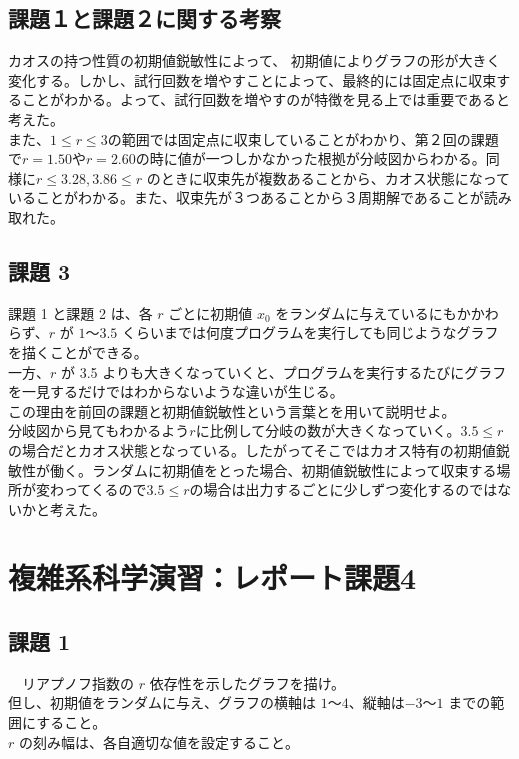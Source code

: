 \documentclass[a4j]{jsarticle}
\begin{document}
\newpage

\subsection{課題１と課題２に関する考察}
カオスの持つ性質の初期値鋭敏性によって、 初期値によりグラフの形が大きく変化する。しかし、試行回数を増やすことによって、最終的には固定点に収束することがわかる。よって、試行回数を増やすのが特徴を見る上では重要であると考えた。\\
また、$1 ≤ r ≤ 3$の範囲では固定点に収束していることがわかり、第２回の課題で$r=1.50$や$r=2.60$の時に値が一つしかなかった根拠が分岐図からわかる。同様に$r ≤ 3.28,3.86 ≤ r$ のときに収束先が複数あることから、カオス状態になっていることがわかる。また、収束先が３つあることから３周期解であることが読み取れた。

\newpage

\subsection{課題 3}
  課題 1 と課題 2 は、各 $r$ ごとに初期値 $x_{0}$ をランダムに与えているにもかかわらず、$r$ が $1$～$3.5$ くらいまでは何度プログラムを実行しても同じようなグラフを描くことができる。\\
一方、$r$ が 3.5 よりも大きくなっていくと、プログラムを実行するたびにグラフを一見するだけではわからないような違いが生じる。\\
この理由を前回の課題と初期値鋭敏性という言葉とを用いて説明せよ。\\


分岐図から見てもわかるよう$r$に比例して分岐の数が大きくなっていく。$3.5 ≤ r$の場合だとカオス状態となっている。したがってそこではカオス特有の初期値鋭敏性が働く。ランダムに初期値をとった場合、初期値鋭敏性によって収束する場所が変わってくるので$3.5 ≤ r$の場合は出力するごとに少しずつ変化するのではないかと考えた。

\newpage

\section{複雑系科学演習：レポート課題4}

\subsection{課題 1}
　リアプノフ指数の $r$ 依存性を示したグラフを描け。\\
但し、初期値をランダムに与え、グラフの横軸は $1$～$4$、縦軸は$-3$～$1$ までの範囲にすること。\\
$r$ の刻み幅は、各自適切な値を設定すること。\\
\end{document}

